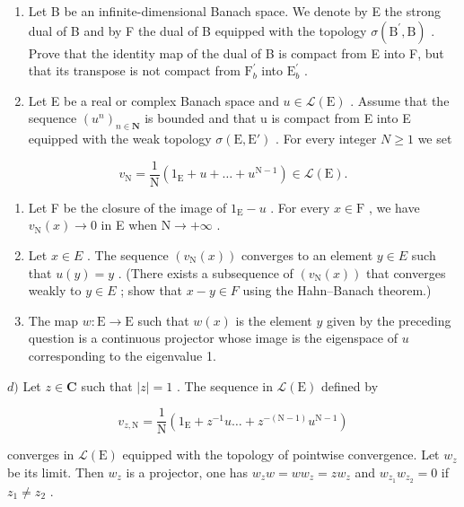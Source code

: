 \begin{enumerate}
\def\labelenumi{\arabic{enumi})}
\setcounter{enumi}{22}
\item
  Let B be an infinite-dimensional Banach space. We denote by E the strong dual of B and by F the dual of B equipped with the topology \(\sigma(\mathrm{B}^{\prime},\mathrm{B})\) . Prove that the identity map of the dual of B is compact from E into F, but that its transpose is not compact from \(\mathrm{F}_{b}^{\prime}\) into \(\mathrm{E}_{b}^{\prime}\) .
\item
  Let E be a real or complex Banach space and \(u \in \mathcal{L}(\mathrm{E})\) . Assume that the sequence \((u^{n})_{n \in \mathbf{N}}\) is bounded and that u is compact from E into E equipped with the weak topology \(\sigma(\mathrm{E}, \mathrm{E}')\) . For every integer \(N \geqslant 1\) we set
\end{enumerate}

\[
v _ {\mathrm{N}} = \frac {1}{\mathrm{N}} (1 _ {\mathrm{E}} + u + \dots + u ^ {\mathrm{N-1}}) \in \mathcal {L} (\mathrm{E}).
\]

\begin{enumerate}
\def\labelenumi{\alph{enumi})}
\item
  Let F be the closure of the image of \(1_{\mathrm{E}} - u\) . For every \(x \in \mathrm{F}\) , we have \(v_{\mathrm{N}}(x) \to 0\) in E when \(\mathrm{N} \to +\infty\) .
\item
  Let \(x \in E\) . The sequence \((v_{\mathrm{N}}(x))\) converges to an element \(y \in E\) such that \(u(y) = y\) . (There exists a subsequence of \((v_{\mathrm{N}}(x))\) that converges weakly to \(y \in E\) ; show that \(x - y \in F\) using the Hahn--Banach theorem.)
\item
  The map \(w \colon \mathrm{E} \to \mathrm{E}\) such that \(w(x)\) is the element \(y\) given by the preceding question is a continuous projector whose image is the eigenspace of \(u\) corresponding to the eigenvalue 1.
\end{enumerate}

\(d)\) Let \(z \in \mathbf{C}\) such that \(|z| = 1\) . The sequence in \(\mathcal{L}(\mathrm{E})\) defined by

\[
v _ {z, \mathrm{N}} = \frac {1}{\mathrm{N}} (1 _ {\mathrm{E}} + z ^ {- 1} u \dots + z ^ {- (\mathrm{N-1})} u ^ {\mathrm{N-1}})
\]

converges in \(\mathcal{L}(\mathrm{E})\) equipped with the topology of pointwise convergence. Let \(w_{z}\) be its limit. Then \(w_{z}\) is a projector, one has \(w_{z}w = ww_{z} = zw_{z}\) and \(w_{z_1}w_{z_2} = 0\) if \(z_{1} \neq z_{2}\) .

